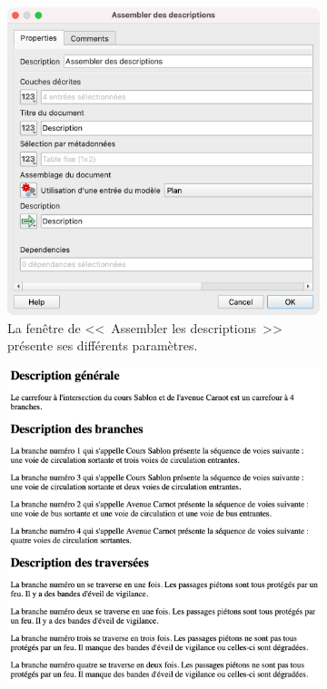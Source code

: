 \begin{figure}[ht]
    \centering
    \begin{subfigure}[t]{.49\linewidth}
        \centering
        \includegraphics[width=\textwidth]{images/experimentation/qgis2desc_assemblage.png}
        \caption{La fenêtre de <<~Assembler les descriptions~>> présente ses différents paramètres.}
        \label{fig:experimentation_assemblage_fenetre}
    \end{subfigure}
    \hfill
    \begin{subfigure}[t]{.49\linewidth}
        \centering
        \includegraphics[width=\textwidth]{images/experimentation/qgis2desc_html.png}

\end{subfigure}
\end{figure}
